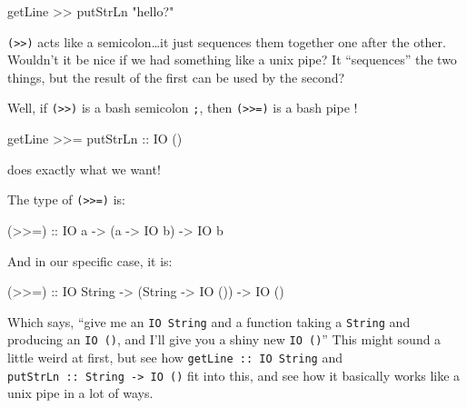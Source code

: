 \documentclass[]{article}
\newenvironment{Shaded}{}{}
\newcommand{\DataTypeTok}[1]{\textcolor[rgb]{0.56,0.13,0.00}{#1}}
\newcommand{\FunctionTok}[1]{\textcolor[rgb]{0.02,0.16,0.49}{#1}}
\newcommand{\NormalTok}[1]{#1}
\newcommand{\OtherTok}[1]{\textcolor[rgb]{0.00,0.44,0.13}{#1}}
\newcommand{\StringTok}[1]{\textcolor[rgb]{0.25,0.44,0.63}{#1}}
\begin{document}
\begin{Shaded}
\begin{Highlighting}[]
\NormalTok{getLine }\FunctionTok{>>}\NormalTok{ putStrLn }\StringTok{"hello?"}
\end{Highlighting}
\end{Shaded}

\texttt{(\textgreater{}\textgreater{})} acts like a semicolon\ldots{}it just
sequences them together one after the other. Wouldn't it be nice if we had
something like a unix pipe? It ``sequences'' the two things, but the result of
the first can be used by the second?

Well, if \texttt{(\textgreater{}\textgreater{})} is a bash semicolon \texttt{;},
then \texttt{(\textgreater{}\textgreater{}=)} is a bash pipe
\texttt{\textbar{}}!

\begin{Shaded}
\begin{Highlighting}[]
\NormalTok{getLine }\FunctionTok{>>=}\NormalTok{ putStrLn}
\OtherTok{                      ::} \DataTypeTok{IO}\NormalTok{ ()}
\end{Highlighting}
\end{Shaded}

does exactly what we want!

The type of \texttt{(\textgreater{}\textgreater{}=)} is:

\begin{Shaded}
\begin{Highlighting}[]
\OtherTok{(>>=) ::} \DataTypeTok{IO}\NormalTok{ a }\OtherTok{->}\NormalTok{ (a }\OtherTok{->} \DataTypeTok{IO}\NormalTok{ b) }\OtherTok{->} \DataTypeTok{IO}\NormalTok{ b}
\end{Highlighting}
\end{Shaded}

And in our specific case, it is:

\begin{Shaded}
\begin{Highlighting}[]
\OtherTok{(>>=) ::} \DataTypeTok{IO} \DataTypeTok{String} \OtherTok{->}\NormalTok{ (}\DataTypeTok{String} \OtherTok{->} \DataTypeTok{IO}\NormalTok{ ()) }\OtherTok{->} \DataTypeTok{IO}\NormalTok{ ()}
\end{Highlighting}
\end{Shaded}

Which says, ``give me an \texttt{IO\ String} and a function taking a
\texttt{String} and producing an \texttt{IO\ ()}, and I'll give you a shiny new
\texttt{IO\ ()}'' This might sound a little weird at first, but see how
\texttt{getLine\ ::\ IO\ String} and
\texttt{putStrLn\ ::\ String\ -\textgreater{}\ IO\ ()} fit into this, and see
how it basically works like a unix pipe in a lot of ways.
\end{document}
